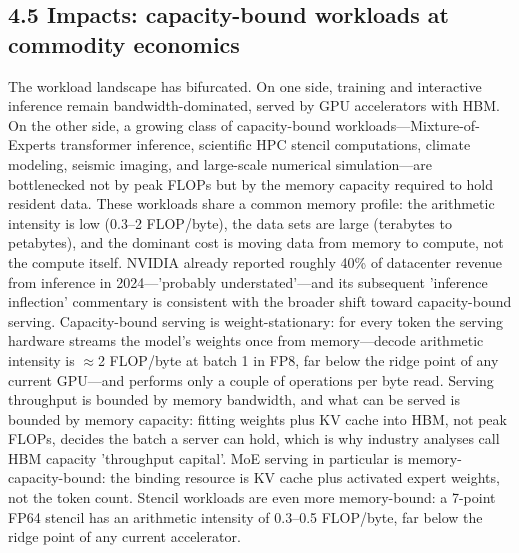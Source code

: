 \documentclass[10pt,twocolumn]{article}
\begin{document}
\subsection*{4.5 Impacts: capacity-bound workloads at commodity economics}\label{sec:4.5}

The workload landscape has bifurcated. On one side, training and interactive inference remain bandwidth-dominated, served by GPU accelerators with HBM. On the other side, a growing class of capacity-bound workloads---Mixture-of-Experts transformer inference, scientific HPC stencil computations, climate modeling, seismic imaging, and large-scale numerical simulation---are bottlenecked not by peak FLOPs but by the memory capacity required to hold resident data\cite{21,22,23,26}. These workloads share a common memory profile: the arithmetic intensity is low (0.3--2 FLOP/byte), the data sets are large (terabytes to petabytes), and the dominant cost is moving data from memory to compute, not the compute itself\cite{5}. NVIDIA already reported roughly 40\% of datacenter revenue from inference in 2024---'probably understated'---and its subsequent 'inference inflection' commentary is consistent with the broader shift toward capacity-bound serving\cite{2}. Capacity-bound serving is weight-stationary: for every token the serving hardware streams the model's weights once from memory---decode arithmetic intensity is $\approx$2 FLOP/byte at batch 1 in FP8, far below the ridge point of any current GPU---and performs only a couple of operations per byte read\cite{24,26}. Serving throughput is bounded by memory bandwidth, and what can be served is bounded by memory capacity: fitting weights plus KV cache into HBM, not peak FLOPs, decides the batch a server can hold, which is why industry analyses call HBM capacity 'throughput capital'\cite{26}. MoE serving in particular is memory-capacity-bound: the binding resource is KV cache plus activated expert weights, not the token count\cite{27}. Stencil workloads are even more memory-bound: a 7-point FP64 stencil has an arithmetic intensity of 0.3--0.5 FLOP/byte, far below the ridge point of any current accelerator\cite{5}.
\end{document}
